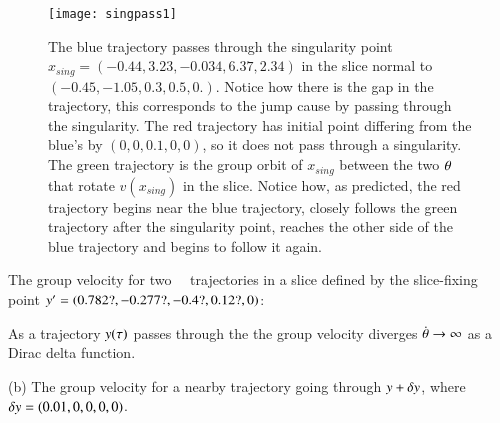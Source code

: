  \begin{figure}
\texttt{[image: singpass1]}
 \caption{\label{fig:singpass}
The blue trajectory passes through the singularity point
$x_{sing}=(-0.44, 3.23, -0.034, 6.37, 2.34)$ in the slice normal to
$(-0.45, -1.05, 0.3, 0.5, 0.)$. Notice how there is the gap in the
trajectory, this corresponds to the jump cause by passing through the
singularity. The red trajectory has initial point differing from the
blue's by $(0,0,0.1,0,0)$, so it does not pass through a singularity. The
green trajectory is the group orbit of $x_{sing}$ between the two
${\bf \theta}$ that rotate $v(x_{sing})$ in the slice. Notice how, as
predicted, the red trajectory begins near the blue trajectory, closely
follows the green trajectory after the singularity point, reaches the
other side of the blue trajectory and begins to follow it
again.
 }%
 \end{figure}



The group velocity for two \cLf\
\reducedsp\ trajectories in a slice defined by the slice-fixing
point ${y'}=(0.782?,-0.277?,-0.4?,0.12?,0)$:

As a trajectory $y(\tau)$ passes through the
{\sset} 
the group velocity diverges
$\dot{{\bf \theta}} \to \infty$ as a Dirac delta function.

(b) The group velocity for a nearby trajectory going
through $y+\delta y$,
where $\delta y=(0.01,0,0,0,0)$.




%
